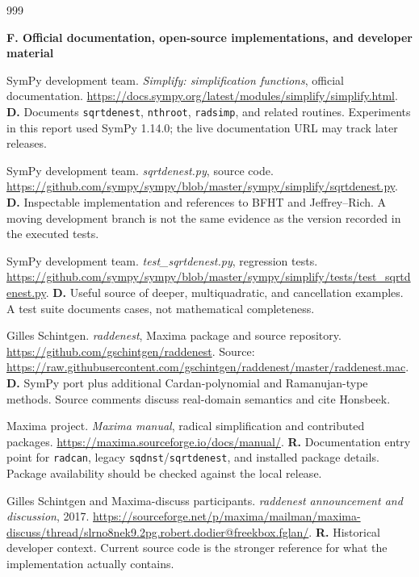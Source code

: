 \documentclass[11pt,a4paper]{article}
\let\sourceurl\url
\theoremstyle{definition}
\theoremstyle{remark}
\numberwithin{equation}{section}
\begin{document}
\begin{thebibliography}{999}
{\item[]\textbf{F. Official documentation, open-source implementations, and developer material}

SymPy development team.
\emph{Simplify: simplification functions}, official documentation.
\sourceurl{https://docs.sympy.org/latest/modules/simplify/simplify.html}.
\textbf{D.} Documents \texttt{sqrtdenest}, \texttt{nthroot}, \texttt{radsimp}, and related routines. Experiments in this report used SymPy 1.14.0; the live documentation URL may track later releases.

SymPy development team.
\emph{sqrtdenest.py}, source code.
\sourceurl{https://github.com/sympy/sympy/blob/master/sympy/simplify/sqrtdenest.py}.
\textbf{D.} Inspectable implementation and references to BFHT and Jeffrey--Rich. A moving development branch is not the same evidence as the version recorded in the executed tests.

SymPy development team.
\emph{test\_sqrtdenest.py}, regression tests.
\sourceurl{https://github.com/sympy/sympy/blob/master/sympy/simplify/tests/test_sqrtdenest.py}.
\textbf{D.} Useful source of deeper, multiquadratic, and cancellation examples. A test suite documents cases, not mathematical completeness.

Gilles Schintgen.
\emph{raddenest}, Maxima package and source repository.
\sourceurl{https://github.com/gschintgen/raddenest}.
Source: \sourceurl{https://raw.githubusercontent.com/gschintgen/raddenest/master/raddenest.mac}.
\textbf{D.} SymPy port plus additional Cardan-polynomial and Ramanujan-type methods. Source comments discuss real-domain semantics and cite Honsbeek.

Maxima project.
\emph{Maxima manual}, radical simplification and contributed packages.
\sourceurl{https://maxima.sourceforge.io/docs/manual/}.
\textbf{R.} Documentation entry point for \texttt{radcan}, legacy \texttt{sqdnst}/\texttt{sqrtdenest}, and installed package details. Package availability should be checked against the local release.

Gilles Schintgen and Maxima-discuss participants.
\emph{raddenest announcement and discussion}, 2017.
\sourceurl{https://sourceforge.net/p/maxima/mailman/maxima-discuss/thread/slrno8nek9.2pg.robert.dodier@freekbox.fglan/}.
\textbf{R.} Historical developer context. Current source code is the stronger reference for what the implementation actually contains.

}
\end{thebibliography}
\end{document}
